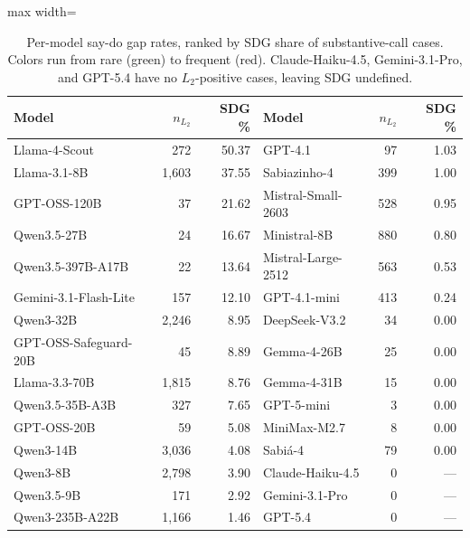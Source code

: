 \begin{table}[htbp]
\centering\small
\caption{Per-model say-do gap rates, ranked by SDG share of substantive-call cases. Colors run from rare (green) to frequent (red). Claude-Haiku-4.5, Gemini-3.1-Pro, and GPT-5.4 have no $L_2$-positive cases, leaving SDG undefined.}
\label{tab:per-model-sdg}
\begin{adjustbox}{max width=\linewidth}
\begin{tabular}{lrr@{\hspace{2em}}lrr}
\toprule
Model & $n_{L_2}$ & SDG \% & Model & $n_{L_2}$ & SDG \% \\
\midrule
Llama-4-Scout & 272 & \cellcolor[HTML]{e85050}50.37 & GPT-4.1 & 97 & \cellcolor[HTML]{b8e6b8}1.03 \\
Llama-3.1-8B & 1{,}603 & \cellcolor[HTML]{e85050}37.55 & Sabiazinho-4 & 399 & \cellcolor[HTML]{b8e6b8}1.00 \\
GPT-OSS-120B & 37 & \cellcolor[HTML]{ff8080}21.62 & Mistral-Small-2603 & 528 & \cellcolor[HTML]{b8e6b8}0.95 \\
Qwen3.5-27B & 24 & \cellcolor[HTML]{ffb070}16.67 & Ministral-8B & 880 & \cellcolor[HTML]{b8e6b8}0.80 \\
Qwen3.5-397B-A17B & 22 & \cellcolor[HTML]{ffb070}13.64 & Mistral-Large-2512 & 563 & \cellcolor[HTML]{b8e6b8}0.53 \\
Gemini-3.1-Flash-Lite & 157 & \cellcolor[HTML]{ffb070}12.10 & GPT-4.1-mini & 413 & \cellcolor[HTML]{d4f0d4}0.24 \\
Qwen3-32B & 2{,}246 & \cellcolor[HTML]{ffe080}8.95 & DeepSeek-V3.2 & 34 & \cellcolor[HTML]{d4f0d4}0.00 \\
GPT-OSS-Safeguard-20B & 45 & \cellcolor[HTML]{ffe080}8.89 & Gemma-4-26B & 25 & \cellcolor[HTML]{d4f0d4}0.00 \\
Llama-3.3-70B & 1{,}815 & \cellcolor[HTML]{ffe080}8.76 & Gemma-4-31B & 15 & \cellcolor[HTML]{d4f0d4}0.00 \\
Qwen3.5-35B-A3B & 327 & \cellcolor[HTML]{ffe080}7.65 & GPT-5-mini & 3 & \cellcolor[HTML]{d4f0d4}0.00 \\
GPT-OSS-20B & 59 & \cellcolor[HTML]{ffe080}5.08 & MiniMax-M2.7 & 8 & \cellcolor[HTML]{d4f0d4}0.00 \\
Qwen3-14B & 3{,}036 & \cellcolor[HTML]{f0f4a8}4.08 & Sabi\'a-4 & 79 & \cellcolor[HTML]{d4f0d4}0.00 \\
Qwen3-8B & 2{,}798 & \cellcolor[HTML]{f0f4a8}3.90 & Claude-Haiku-4.5 & 0 & --- \\
Qwen3.5-9B & 171 & \cellcolor[HTML]{f0f4a8}2.92 & Gemini-3.1-Pro & 0 & --- \\
Qwen3-235B-A22B & 1{,}166 & \cellcolor[HTML]{b8e6b8}1.46 & GPT-5.4 & 0 & --- \\
\bottomrule
\end{tabular}
\end{adjustbox}
\end{table}

